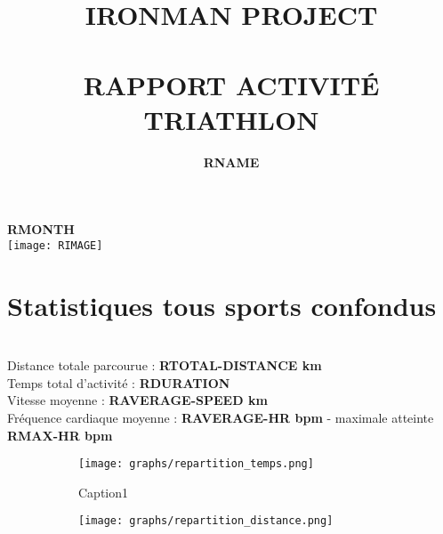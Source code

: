 \documentclass[a4paper,french,11pt]{report}
\title{	\normalsize \textsc{\uppercase{ironman project}}
		 	\\[1.2cm]
			\HRule{0.7pt} \\
			\vspace{0.5cm}
			\LARGE \textbf{\uppercase{rapport activité triathlon}}	%
			\HRule{1pt} \\
			\vspace{1.7cm}
		}
\author{
		\textbf{RNAME}\\
}
\makeatletter
\def\printtitle{%
    {\centering \@title\par}}
\def\printauthor{%
    {\centering \large \@author}}
\makeatother
\begin{document}

\thispagestyle{empty}		%

\printtitle					%
\printauthor				%
\vspace{1cm}

\begin{center}

\LARGE{\textbf{RMONTH}}\\
\vspace{4cm}
\texttt{[image: RIMAGE]}\\

\end{center}

\newpage




\section*{Statistiques tous sports confondus}


\\
\textbullet Distance totale parcourue : \textbf{RTOTAL-DISTANCE km} \\
\textbullet Temps total d'activité : \textbf{RDURATION} \\
\textbullet Vitesse moyenne : \textbf{RAVERAGE-SPEED km} \\
\textbullet Fréquence cardiaque moyenne : \textbf{RAVERAGE-HR bpm} - maximale atteinte \textbf{RMAX-HR bpm}\\
  
\begin{figure}[h]

\begin{subfigure}{0.5\textwidth}
\texttt{[image: graphs/repartition\_temps.png]} 
\caption{Caption1}
\label{fig:subim1}
\end{subfigure}
\begin{subfigure}{0.5\textwidth}
\texttt{[image: graphs/repartition\_distance.png]}
\label{fig:subim2}
\end{subfigure}

\label{fig:image2}
\end{figure}
\end{document}

